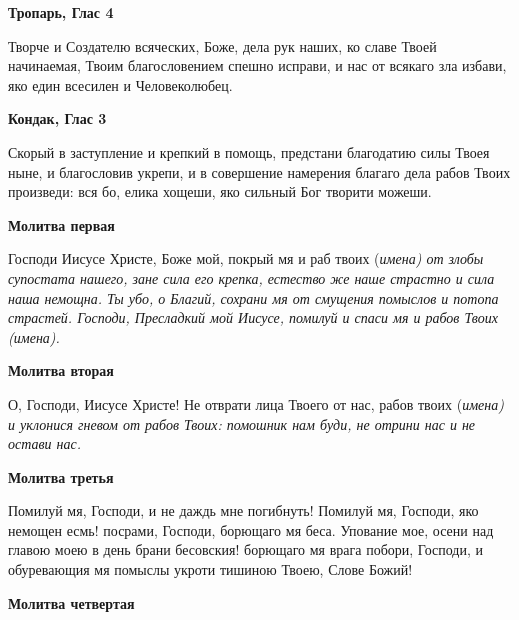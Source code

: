 

\label{_content_razlichnie_molitvi}

 

 


\medskip\bfseries Тропарь, Глас 4\normalfont{}\nopagebreak


Творче и Создателю всяческих, Боже, дела рук наших, ко славе Твоей начинаемая, Твоим благословением спешно исправи, и нас от всякаго зла избави, яко един всесилен и Человеколюбец.


\medskip\bfseries Кондак, Глас 3\normalfont{}\nopagebreak


Скорый в заступление и крепкий в помощь, предстани благодатию силы Твоея ныне, и благословив укрепи, и в совершение намерения благаго дела рабов Твоих произведи: вся бо, елика хощеши, яко сильный Бог творити можеши. 
\mychapterending

 


\medskip\bfseries Молитва первая\normalfont{}\nopagebreak


Господи Иисусе Христе, Боже мой, покрый мя и раб твоих (\itshape имена\normalfont{}) от злобы супостата нашего, зане сила его крепка, естество же наше страстно и сила наша немощна. Ты убо, о Благий, сохрани мя от смущения помыслов и потопа страстей. Господи, Пресладкий мой Иисусе, помилуй и спаси мя и рабов Твоих (\itshape имена\normalfont{}).


\medskip\bfseries Молитва вторая\normalfont{}\nopagebreak


О, Господи, Иисусе Христе! Не отврати лица Твоего от нас, рабов твоих (\itshape имена\normalfont{}) и уклонися гневом от рабов Твоих: помошник нам буди, не отрини нас и не остави нас.


\medskip\bfseries Молитва третья\normalfont{}\nopagebreak


Помилуй мя, Господи, и не даждь мне погибнуть! Помилуй мя, Господи, яко немощен есмь! посрами, Господи, борющаго мя беса. Упование мое, осени над главою моею в день брани бесовския! борющаго мя врага побори, Господи, и обуревающия мя помыслы укроти тишиною Твоею, Слове Божий!


\medskip\bfseries Молитва четвертая\normalfont{}\nopagebreak



